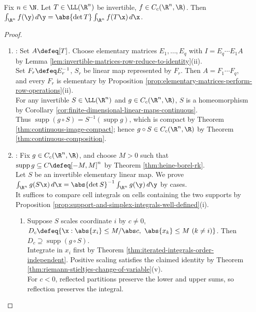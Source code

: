 \begin{theorem} \label{thm:linear-map-volume-scaling-determinant} \\
Fix $n\in\N$. Let $T\in\LL(\R^n)$ be invertible, $f\in C_c(\R^n,\R)$. Then $\int_{\R^n}f(\y)\,d\y=\abs{\det T}\int_{\R^n}f(T\x)\,d\x$.
\begin{proof}
\begin{enumerate}[label=(\roman*)]
\setlength{\itemsep}{0pt}
\item {}: Set $A\defeq[T]$. Choose elementary matrices $E_1,\ldots,E_q$ with $I=E_q\cdots E_1A$ by Lemma \ref{lem:invertible-matrices-row-reduce-to-identity}(ii).\\
Set $F_r\defeq E_r^{-1}$, $S_r$ be linear map represented by $F_r$. Then $A=F_1\cdots F_q$, and every $F_r$ is elementary by Proposition \ref{prop:elementary-matrices-perform-row-operations}(ii).\\
For any invertible $S\in\LL(\R^n)$ and $g\in C_c(\R^n,\R)$, $S$ is a homeomorphism by Corollary \ref{cor:finite-dimensional-linear-maps-continuous}.\\
Thus $\operatorname{supp}(g\circ S)=S^{-1}(\operatorname{supp}g)$, which is compact by Theorem \ref{thm:continuous-image-compact}; hence $g\circ S\in C_c(\R^n,\R)$ by Theorem \ref{thm:continuous-composition}.
\item {}: Fix $g\in C_c(\R^n,\R)$, and choose $M>0$ such that $\operatorname{supp}g\subseteq C\defeq[-M,M]^n$ by Theorem \ref{thm:heine-borel-rk}.\\
Let $S$ be an invertible elementary linear map. We prove $\int_{\R^n}g(S\x)\,d\x=\abs{\det S}^{-1}\int_{\R^n}g(\y)\,d\y$ by cases.\\
It suffices to compare cell integrals on cells containing the two supports by Proposition \ref{prop:support-and-simplex-integrals-well-defined}(i).
\begin{enumerate}[label=(\alph*)]
\setlength{\itemsep}{0pt}
\item Suppose $S$ scales coordinate $i$ by $c\neq0$, $D_c\defeq\{\x:\abs{x_i}\leq M/\abs c,\ \abs{x_k}\leq M\ (k\neq i)\}$. Then $D_c\supseteq\operatorname{supp}(g\circ S)$.\\
Integrate in $x_i$ first by Theorem \ref{thm:iterated-integrals-order-independent}. Positive scaling satisfies the claimed identity by Theorem \ref{thm:riemann-stieltjes-change-of-variable}(v).\\
For $c<0$, reflected partitions preserve the lower and upper sums, so reflection preserves the integral.\\

\end{enumerate}
\end{enumerate}
\end{proof}
\end{theorem}
